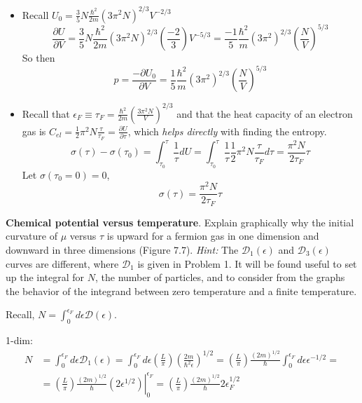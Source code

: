  \begin{itemize}
\item[(a)] Recall $U_0 = \frac{3}{5} N \frac{ \hbar^2}{2m} (3\pi^2 N)^{2/3} V^{-2/3}$
\[
\frac{ \partial U}{ \partial V} = \frac{3}{5} N \frac{ \hbar^2 }{2m} (3\pi^2 N )^{2/3} \left( \frac{-2}{3} \right) V^{-5/3} = \frac{-1}{5} \frac{ \hbar^2}{m} (3\pi^2 )^{2/3} \left( \frac{N}{V} \right)^{5/3}
\]
So then 
\[
\boxed{ p = \frac{ - \partial U_0}{ \partial V} = \frac{1}{5} \frac{ \hbar^2}{m} (3\pi^2)^{2/3} \left( \frac{N}{V} \right)^{5/3} }
\]
\item[(b)] Recall that $\epsilon_F \equiv \tau_F = \frac{ \hbar^2}{2m} \left( \frac{ 3\pi^2 N}{V} \right)^{2/3}$ and that the heat capacity of an electron gas is $C_{el} = \frac{1}{2} \pi^2 N \frac{\tau }{\tau_F} = \frac{ \partial U}{ \partial \tau }$, which \emph{helps directly} with finding the entropy.  
\[
\sigma(\tau) - \sigma(\tau_0) = \int_{\tau_0}^{\tau} \frac{1}{\tau} dU = \int_{\tau_0}^{\tau} \frac{1}{\tau} \frac{1}{2} \pi^2 N \frac{ \tau}{\tau_F} d\tau = \frac{ \pi^2 N}{ 2 \tau_F} \tau
\]
Let $\sigma(\tau_0 =0) =0$, 
\[
\boxed{ \sigma(\tau) = \frac{ \pi^2 N}{ 2\tau_F }\tau   }
\]
\end{itemize}

 \textbf{Chemical potential versus temperature}.  Explain graphically why the initial curvature of $\mu$ versus $\tau$ is upward for a fermion gas in one dimension and downward in three dimensions (Figure 7.7).  \emph{Hint:} The $\mathcal{D}_1(\epsilon)$ and $\mathcal{D}_3(\epsilon)$ curves are different, where $\mathcal{D}_1$ is given in Problem 1.  It will be found useful to set up the integral for $N$, the number of particles, and to consider from the graphs the behavior of the integrand between zero temperature and a finite temperature.  

 Recall, $N = \int_0^{\epsilon_F} d\epsilon \mathcal{D}(\epsilon)$.  

1-dim: \[ \begin{aligned} N & = \int_0^{\epsilon_F} d\epsilon \mathcal{D}_1(\epsilon) = \int_0^{\epsilon_F} d\epsilon \left( \frac{L}{\pi} \right) \left( \frac{2m}{\hbar^2 \epsilon } \right)^{1/2} = \left( \frac{L}{\pi} \right) \frac{(2m)^{1/2} }{\hbar} \int_0^{\epsilon_F} d\epsilon \epsilon^{-1/2} = \\ & = \left. \left( \frac{L}{\pi} \right) \frac{(2m)^{1/2} }{\hbar}  (2 \epsilon^{1/2} )\right|_0^{\epsilon_F} = \left( \frac{L}{\pi} \right) \frac{ (2m)^{1/2}}{ \hbar} 2 \epsilon_F^{1/2} 
\end{aligned}
\]

